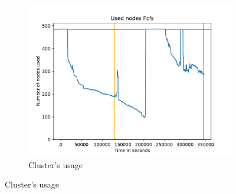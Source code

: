 \documentclass[a4paper]{article}
\begin{document}
\begin{figure}[H]\centering
\begin{subfigure}[b]{0.4\linewidth}\centering\includegraphics[width=1\linewidth]{MBSS/plot/2022-04-07->2022-04-09_V9271_Fcfs_Used_nodes_450_128_32_256_4_1024.pdf}\caption{Cluster's usage}\end{subfigure}

\end{figure}
\end{document}
